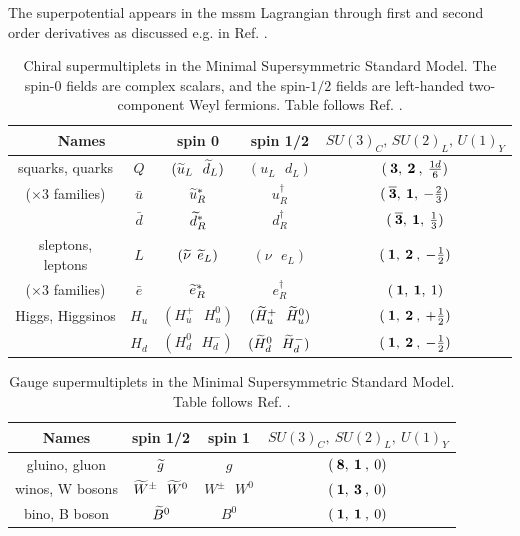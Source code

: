 \noindent The superpotential appears in the \gls{mssm} Lagrangian through first and second order derivatives as discussed e.g. in Ref. \cite{Martin:1997ns}.

\begin{table}[h]
\begin{center}
\begin{tabular}{c c c c c}
\hline
\multicolumn{2}{c}{Names} 
& spin 0 & spin 1/2 & $SU(3)_C ,\, SU(2)_L ,\, U(1)_Y$
\\  \hline\hline
squarks, quarks & $Q$ & $({\widetilde{u}}_L\>\>\>{\widetilde{d}}_L )$&
 $(u_L\>\>\>d_L)$ & $(\>{\bf 3},\>{\bf 2}\>,\>{1d\over 6})$
\\
($\times 3$ families) & $\bar{u}$
&${\widetilde{u}}^*_R$ & $u^\dagger_R$ & 
$(\>{\bf \overline 3},\> {\bf 1},\> -{2\over 3})$
\\ & $\bar{d}$ &${\widetilde{d}}^*_R$ & $d^\dagger_R$ & 
$(\>{\bf \overline 3},\> {\bf 1},\> {1\over 3})$
\\  \hline
sleptons, leptons & $L$ &$({\widetilde{\nu}}\>\>{\widetilde{e}}_L )$&
 $(\nu\>\>\>e_L)$ & $(\>{\bf 1},\>{\bf 2}\>,\>-{1\over 2})$
\\
($\times 3$ families) & $\bar{e}$
&${\widetilde{e}}^*_R$ & $e^\dagger_R$ & $(\>{\bf 1},\> {\bf 1},\>1)$
\\  \hline
Higgs, Higgsinos &$H_u$ &$(H_u^+\>\>\>H_u^0 )$&
$(\widetilde{H}_u^+ \>\>\> \widetilde{H}_u^0)$& 
$(\>{\bf 1},\>{\bf 2}\>,\>+{1\over 2})$
\\ &$H_d$ & $(H_d^0 \>\>\> H_d^-)$ & $(\widetilde{H}_d^0 \>\>\> \widetilde{H}_d^-)$& 
$(\>{\bf 1},\>{\bf 2}\>,\>-{1\over 2})$
\\  \hline
\end{tabular}
\caption{Chiral supermultiplets in the Minimal Supersymmetric Standard Model.
The spin-$0$ fields are complex scalars, and the spin-$1/2$ fields are 
left-handed two-component Weyl fermions. Table follows Ref. \cite{Martin:1997ns}. \label{tab:chiral}}
\vspace{-0.6cm}
\end{center}
\end{table}



\begin{table}[h]
\begin{center}
\begin{tabular}{c c c c}
\hline
Names & spin 1/2 & spin 1 & $SU(3)_C, \> SU(2)_L,\> U(1)_Y$\\
\hline\hline
gluino, gluon &$ \widetilde{g}$& $g$ & $(\>{\bf 8},\>{\bf 1}\>,\> 0)$
\\
\hline
winos, W bosons & $ \widetilde {W}^\pm\>\>\> \widetilde {W}^0 $&
 $W^\pm\>\>\> W^0$ & $(\>{\bf 1},\>{\bf 3}\>,\> 0)$
\\
\hline
bino, B boson &$\widetilde{B}^0$&
 $B^0$ & $(\>{\bf 1},\>{\bf 1}\>,\> 0)$
\\
\hline
\end{tabular}
\caption{Gauge supermultiplets in
the Minimal Supersymmetric Standard Model. Table follows Ref. \cite{Martin:1997ns}. \label{tab:gauge}}
\vspace{-0.45cm}
\end{center}
\end{table}

